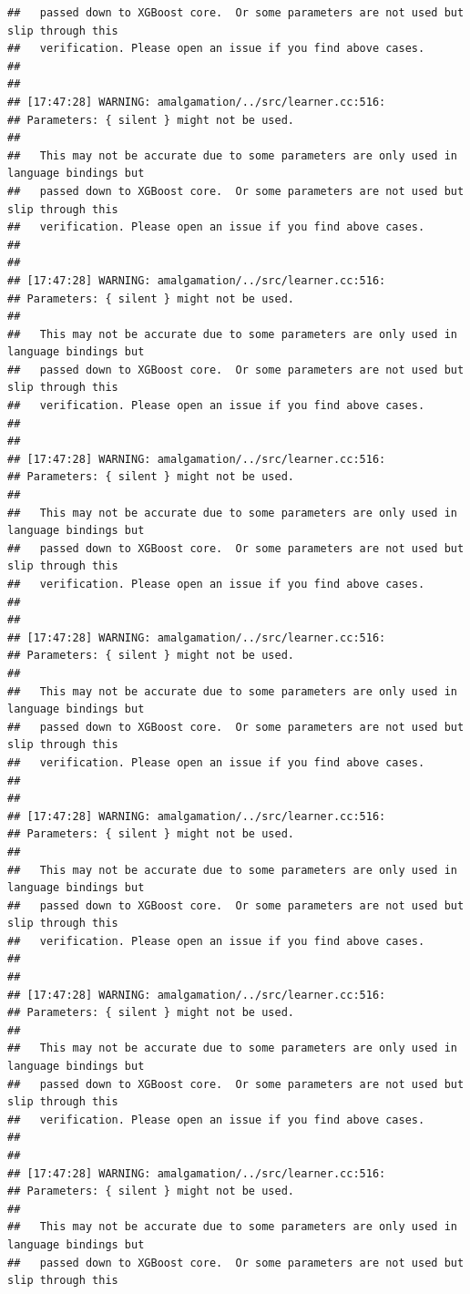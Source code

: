 \documentclass[AMS,STIX2COL]{WileyNJD-v2}\usepackage[]{graphicx}\usepackage[]{color}
\makeatletter
\newenvironment{kframe}{%
 \def\at@end@of@kframe{}%
 \ifinner\ifhmode%
  \def\at@end@of@kframe{\end{minipage}}%
  \begin{minipage}{\columnwidth}%
 \fi\fi%
 \def\FrameCommand##1{\hskip\@totalleftmargin \hskip-\fboxsep
 \colorbox{shadecolor}{##1}\hskip-\fboxsep
     \hskip-\linewidth \hskip-\@totalleftmargin \hskip\columnwidth}%
 \MakeFramed {\advance\hsize-\width
   \@totalleftmargin\z@ \linewidth\hsize
   \@setminipage}}%
 {\par\unskip\endMakeFramed%
 \at@end@of@kframe}
\newenvironment{knitrout}{}{} %
\makeatother
\begin{document}
\begin{knitrout}
\begin{kframe}
\begin{verbatim}
##   passed down to XGBoost core.  Or some parameters are not used but slip through this
##   verification. Please open an issue if you find above cases.
## 
## 
## [17:47:28] WARNING: amalgamation/../src/learner.cc:516: 
## Parameters: { silent } might not be used.
## 
##   This may not be accurate due to some parameters are only used in language bindings but
##   passed down to XGBoost core.  Or some parameters are not used but slip through this
##   verification. Please open an issue if you find above cases.
## 
## 
## [17:47:28] WARNING: amalgamation/../src/learner.cc:516: 
## Parameters: { silent } might not be used.
## 
##   This may not be accurate due to some parameters are only used in language bindings but
##   passed down to XGBoost core.  Or some parameters are not used but slip through this
##   verification. Please open an issue if you find above cases.
## 
## 
## [17:47:28] WARNING: amalgamation/../src/learner.cc:516: 
## Parameters: { silent } might not be used.
## 
##   This may not be accurate due to some parameters are only used in language bindings but
##   passed down to XGBoost core.  Or some parameters are not used but slip through this
##   verification. Please open an issue if you find above cases.
## 
## 
## [17:47:28] WARNING: amalgamation/../src/learner.cc:516: 
## Parameters: { silent } might not be used.
## 
##   This may not be accurate due to some parameters are only used in language bindings but
##   passed down to XGBoost core.  Or some parameters are not used but slip through this
##   verification. Please open an issue if you find above cases.
## 
## 
## [17:47:28] WARNING: amalgamation/../src/learner.cc:516: 
## Parameters: { silent } might not be used.
## 
##   This may not be accurate due to some parameters are only used in language bindings but
##   passed down to XGBoost core.  Or some parameters are not used but slip through this
##   verification. Please open an issue if you find above cases.
## 
## 
## [17:47:28] WARNING: amalgamation/../src/learner.cc:516: 
## Parameters: { silent } might not be used.
## 
##   This may not be accurate due to some parameters are only used in language bindings but
##   passed down to XGBoost core.  Or some parameters are not used but slip through this
##   verification. Please open an issue if you find above cases.
## 
## 
## [17:47:28] WARNING: amalgamation/../src/learner.cc:516: 
## Parameters: { silent } might not be used.
## 
##   This may not be accurate due to some parameters are only used in language bindings but
##   passed down to XGBoost core.  Or some parameters are not used but slip through this

\end{verbatim}
\end{kframe}
\end{knitrout}
\end{document}
